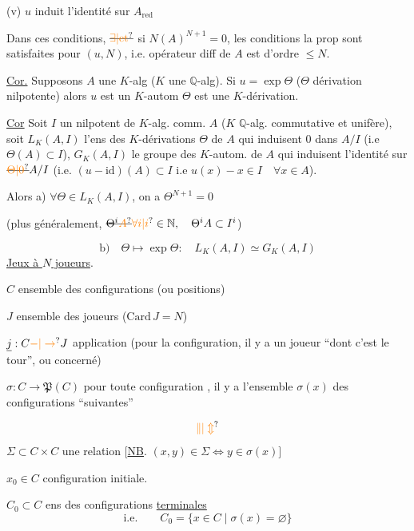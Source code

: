 (v) $u$ induit l'identité sur $A_{\mathrm{red}}$

Dans ces conditions, $\deleted{\unsure{\exists|\text{et}}}$ si  $N(A)^{N+1}=0$, les conditions  la prop sont satisfaites pour $(u,N)$, i.e.  opérateur diff de $A$ est d'ordre $\leq N$.

\uline{Cor.} Supposons $A$ une $K$-alg ($K$ une $\mathbb{Q}$-alg). Si $u=\exp\Theta$ ($\Theta$ dérivation nilpotente) alors $u$ est un $K$-autom  $\Theta$ est une $K$-dérivation.

\uline{Cor} Soit $I$ un  nilpotent de  $K$-alg. comm. $A$ ($K$ $\mathbb{Q}$-alg. commutative et unifère),  soit $L_K(A,I)$ l'ens des $K$-dérivations $\Theta$  de $A$ qui induisent $0$ dans $A/I$ (i.e $\Theta(A)\subset I$), $G_K(A,I)$ le groupe des $K$-autom. de $A$  qui induisent l'identité sur $\deleted{\unsure{\Theta|0}}A/I$ (i.e. $(u-\mathrm{id})(A)\subset I$ i.e $u(x)-x\in I\quad\forall x\in A$).

Alors \quad a) $\forall\Theta\in L_K(A,I)$, on a $\Theta^{N+1}=0$

(plus généralement, $\deleted{\Theta^{i}\unsure{A}}\unsure{\forall i|i}\in\mathbb{N},\quad\Theta^i A\subset I^i$)

\[
\text{b)}\quad\Theta\longmapsto\exp\Theta:\quad L_K(A,I)\simeq G_K(A,I)
\]
\uline{Jeux à $N$ joueurs}.

$C$ ensemble des configurations (ou positions)

$J$ ensemble des joueurs \quad ($\mathrm{Card}\,J=N$)

$\underline{j}:C\unsure{-|\to}J$ \quad application \quad (pour la configuration, il y a un joueur ``dont c'est le tour'', ou concerné)

$\sigma:C\longrightarrow\mathfrak{P}(C)$ \quad pour toute configuration , il y a l'ensemble $\sigma(x)$ des configurations ``suivantes''

\[
\unsure{\Vert|\Updownarrow}
\]
$\Sigma\subset C\times C$ \quad une relation \qquad $[$\uline{NB}. \quad $(x,y)\in\Sigma\Longleftrightarrow y\in\sigma(x)]$

$x_0\in C$ \quad configuration initiale.

$C_0\subset C$ \quad ens des configurations  \uline{terminales}
\[
\text{i.e.}\qquad C_0=\{x\in C\mid\sigma(x)=\varnothing\}
\]

